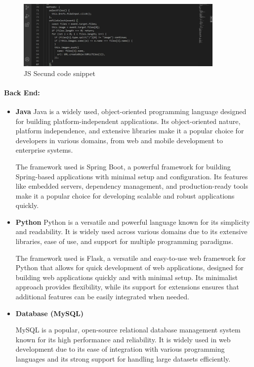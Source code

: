 \begin{figure}
 \centering
    \includegraphics[width=0.90\textwidth]{Img/Chap-01/38.jpg}
    \caption{JS Secund code snippet}
    \label{fig:js_code_ex2}
\end{figure}

\paragraph{Back End:}
\begin{itemize}
    \item \textbf{Java}
    Java is a widely used, object-oriented programming language designed for building platform-independent applications. Its object-oriented nature, platform independence, and extensive libraries make it a popular choice for developers in various domains, from web and mobile development to enterprise systems.

    The framework used is Spring Boot, a powerful framework for building Spring-based applications with minimal setup and configuration. Its features like embedded servers, dependency management, and production-ready tools make it a popular choice for developing scalable and robust applications quickly.

    \item \textbf{Python}
    Python is a versatile and powerful language known for its simplicity and readability. It is widely used across various domains due to its extensive libraries, ease of use, and support for multiple programming paradigms.

    The framework used is Flask, a versatile and easy-to-use web framework for Python that allows for quick development of web applications, designed for building web applications quickly and with minimal setup. Its minimalist approach provides flexibility, while its support for extensions ensures that additional features can be easily integrated when needed.

    \item \textbf{Database (MySQL)}
    
    MySQL is a popular, open-source relational database management system known for its high performance and reliability. It is widely used in web development due to its ease of integration with various programming languages and its strong support for handling large datasets efficiently.
    
\end{itemize}

